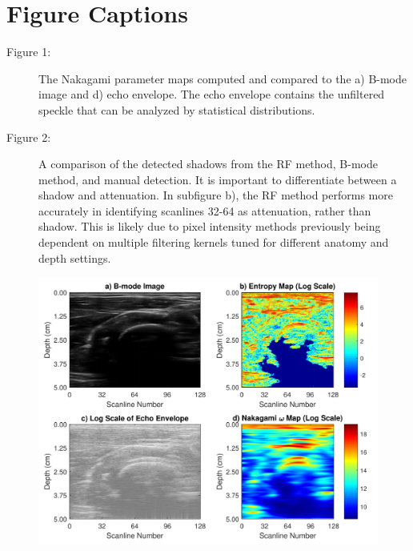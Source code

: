 \documentclass[preprint,5p,authoryear]{elsarticle}
\begin{document}
\pagebreak







\pagebreak

\section*{Figure Captions}

\begin{description}
\item[Figure 1:]  The Nakagami parameter maps computed and compared to the a) B-mode image and d) echo envelope. The echo envelope contains the unfiltered speckle that can be analyzed by statistical distributions.
\item[Figure 2:]  A comparison of the detected shadows from the RF method, B-mode method, and manual detection. It is important to differentiate between$  $ a shadow and attenuation. In subfigure b), the RF method performs more accurately in identifying scanlines 32-64 as attenuation, rather than shadow. This is likely due to pixel intensity methods previously being dependent on multiple filtering kernels tuned for different anatomy and depth settings.
\end{description}

\begin{figure}[H]
	\centering
	\includegraphics[scale=0.5]{fig2.pdf}
\end{figure}
\end{document}
